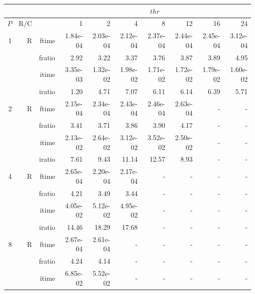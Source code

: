 \documentclass[a4paper]{article}
\begin{document}
\begin{table}[htbp]
\begin{center}
\begin{small}
\begin{tabular}{|r|r|r|r|r|r|r|r|r|r|}
\hline 
     & & & \multicolumn{7}{c|}{$thr$} \\ \hline
    $P$ & R/C &  & 1           & 2    & 4    & 8    & 12   & 16    & 24  \\ \hline\hline
     1 & R & ftime & 1.84e-04 & 2.03e-04 & 2.12e-04 & 2.37e-04 & 2.44e-04 & 2.45e-04 & 3.12e-04 \\   
          &      & fratio & 2.92 & 3.22 & 3.37 & 3.76 & 3.87 & 3.89 & 4.95 \\   
          &      & itime & 3.35e-03 & 1.32e-02 & 1.98e-02 & 1.71e-02 & 1.72e-02 & 1.79e-02 & 1.60e-02 \\   
          &      & iratio & 1.20 & 4.71 & 7.07 & 6.11 & 6.14 & 6.39 & 5.71 \\ \hline 
     2 & R & ftime & 2.15e-04 & 2.34e-04 & 2.43e-04 & 2.46e-04 & 2.63e-04 &     -     &     -     \\   
          &      & fratio & 3.41 & 3.71 & 3.86 & 3.90 & 4.17 &     -     &     -     \\   
          &      & itime & 2.13e-02 & 2.64e-02 & 3.12e-02 & 3.52e-02 & 2.50e-02 &     -     &     -     \\   
          &      & iratio & 7.61 & 9.43 & 11.14 & 12.57 & 8.93 &     -     &     -     \\ \hline 
     4 & R & ftime & 2.65e-04 & 2.20e-04 & 2.17e-04 &     -     &     -     &     -     &     -     \\   
          &      & fratio & 4.21 & 3.49 & 3.44 &     -     &     -     &     -     &     -     \\   
          &      & itime & 4.05e-02 & 5.12e-02 & 4.95e-02 &     -     &     -     &     -     &     -     \\   
          &      & iratio & 14.46 & 18.29 & 17.68 &     -     &     -     &     -     &     -     \\ \hline 
     8 & R & ftime & 2.67e-04 & 2.61e-04 &     -     &     -     &     -     &     -     &     -     \\   
          &      & fratio & 4.24 & 4.14 &     -     &     -     &     -     &     -     &     -     \\   
          &      & itime & 6.85e-02 & 5.52e-02 &     -     &     -     &     -     &     -     &     -     \\   

\end{tabular}
\end{small}
\end{center}
\end{table}
\end{document}
